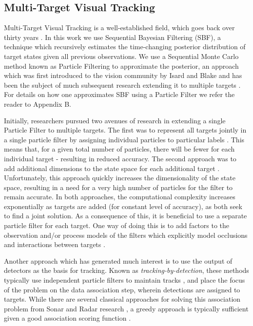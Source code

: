 \subsection{Multi-Target Visual Tracking}
Multi-Target Visual Tracking is a well-established field, which goes back over thirty years \cite{MTT_JPDA}. In this work we use Sequential Bayesian Filtering (SBF), a technique which recursively estimates the time-changing posterior distribution of target states given all previous observations. We use a Sequential Monte Carlo method known as Particle Filtering to approximate the posterior, an approach which was first introduced to the vision community by Isard and Blake \cite{Condensation98} and has been the subject of much subsequent research extending it to multiple targets \cite{TrackingMultipleParticleFiltering,MonteCarloMTT,SequentialMonteCarloMultitargetFiltering}. For details on how one approximates SBF using a Particle Filter we refer the reader to Appendix B.

Initially, researchers pursued two avenues of research in extending a single Particle Filter to multiple targets. The first was to represent all targets jointly in a single particle filter by assigning individual particles to particular labels \cite{MultiMixtureTracking03}. This means that, for a given total number of particles, there will be fewer for each individual target - resulting in reduced accuracy. The second approach was to add additional dimensions to the state space for each additional target \cite{TrackMultTargets01}. Unfortunately, this approach quickly increases the dimensionality of the state space, resulting in a need for a very high number of particles for the filter to remain accurate. In both approaches, the computational complexity increases exponentially as targets are added (for constant level of accuracy), as both seek to find a joint solution. As a consequence of this, it is beneficial to use a separate particle filter for each target. One way of doing this is to add factors to the observation and/or process models of the filters which explicitly model occlusions and interactions between targets \cite{MCMCParteFilt_05, ApproxMultiTrack_06}. 

Another approach which has generated much interest is to use the output of detectors as the basis for tracking. Known as \emph{tracking-by-detection}, these methods typically use independent particle filters to maintain tracks \cite{RobustVTMT_06,MultipersonTBD_011}, and place the focus of the problem on the data association step, wherein detections are assigned to targets. While there are several classical approaches for solving this association problem from Sonar and Radar research \cite{SonarMultiTrack_83,MultiTrack_79}, a greedy approach is typically sufficient given a good association scoring function \cite{DetTrackMultiHumans_07,MultipersonTBD_011}. 

